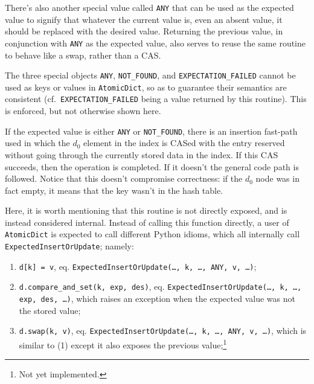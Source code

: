 There's also another special value called \texttt{ANY} that can be used as the expected value to signify that whatever the current value is, even an absent value, it should be replaced with the desired value.
Returning the previous value, in conjunction with \texttt{ANY} as the expected value, also serves to reuse the same routine to behave like a swap, rather than a CAS\@.

The three special objects \texttt{{ANY}}, \texttt{{NOT\_FOUND}}, and \texttt{{EXPECTATION\_FAILED}} cannot be used as keys or values in \texttt{AtomicDict}, so as to guarantee their semantics are consistent (cf.\texttt{\ {EXPECTATION\_FAILED}} being a value returned by this routine).
This is enforced, but not otherwise shown here.

If the expected value is either \texttt{{ANY}} or \texttt{{NOT\_FOUND}}, there is an insertion fast-path used in which the $d_0$ element in the index is CASed with the entry reserved without going through the currently stored data in the index.
If this CAS succeeds, then the operation is completed.
If it doesn't the general code path is followed.
Notice that this doesn't compromise correctness: if the $d_0$ node was in fact empty, it means that the key wasn't in the hash table.

Here, it is worth mentioning that this routine is not directly exposed, and is instead considered internal.
Instead of calling this function directly, a user of \texttt{AtomicDict} is expected to call different Python idioms, which all internally call \texttt{ExpectedInsertOrUpdate}; namely:

\begin{enumerate}
	\item \texttt{{d[k] = v}}, eq. \texttt{{ExpectedInsertOrUpdate(\ldots, k, \ldots, ANY, v, \ldots)}};
	\item \texttt{{d.compare\_and\_set(k, exp, des)}}, eq. \texttt{{ExpectedInsertOrUpdate(\ldots, k, \ldots, exp, des, \ldots)}}, which raises an exception when the expected value was not the stored value;
	\item \texttt{{d.swap(k, v)}}, eq. \texttt{{ExpectedInsertOrUpdate(\ldots, k, \ldots, ANY, v, \ldots)}}, which is similar to (1) except it also exposes the previous value;\footnote{Not yet implemented.}
\end{enumerate}

